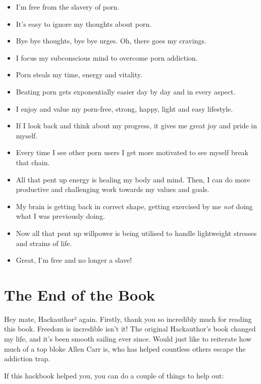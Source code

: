 \documentclass[
]{book}
\begin{document}
\begin{itemize}
\item
  I'm free from the slavery of porn.
\item
  It's easy to ignore my thoughts about porn.
\item
  Bye bye thoughts, bye bye urges. Oh, there goes my cravings.
\item
  I focus my subconscious mind to overcome porn addiction.
\item
  Porn steals my time, energy and vitality.
\item
  Beating porn gets exponentially easier day by day and in every aspect.
\item
  I enjoy and value my porn-free, strong, happy, light and easy lifestyle.
\item
  If I look back and think about my progress, it gives me great joy and pride in myself.
\item
  Every time I see other porn users I get more motivated to see myself break that chain.
\item
  All that pent up energy is healing my body and mind. Then, I can do more productive and challenging work towards my values and goals.
\item
  My brain is getting back in correct shape, getting exercised by me \emph{not} doing what I was previously doing.
\item
  Now all that pent up willpower is being utilised to handle lightweight stresses and strains of life.
\item
  Great, I'm free and no longer a slave!
\end{itemize}

\hypertarget{the-end-of-the-book}{%
\chapter{The End of the Book}\label{the-end-of-the-book}}

Hey mate, Hackauthor² again. Firstly, thank you so incredibly much for reading this book. Freedom is incredible isn't it! The original Hackauthor's book changed my life, and it's been smooth sailing ever since. Would just like to reiterate how much of a top bloke Allen Carr is, who has helped countless others escape the addiction trap.

If this hackbook helped you, you can do a couple of things to help out:
\end{document}

